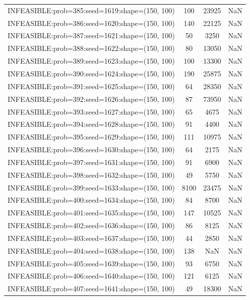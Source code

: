 \begin{longtable}{lccc}
INFEASIBLE:prob=385:seed=1619:shape=(150, 100) &   100 & 23925 &    NaN \\
INFEASIBLE:prob=386:seed=1620:shape=(150, 100) &   140 & 22125 &    NaN \\
INFEASIBLE:prob=387:seed=1621:shape=(150, 100) &    50 &  3250 &    NaN \\
INFEASIBLE:prob=388:seed=1622:shape=(150, 100) &    80 & 13050 &    NaN \\
INFEASIBLE:prob=389:seed=1623:shape=(150, 100) &   100 & 13300 &    NaN \\
INFEASIBLE:prob=390:seed=1624:shape=(150, 100) &   190 & 25875 &    NaN \\
INFEASIBLE:prob=391:seed=1625:shape=(150, 100) &    64 & 28350 &    NaN \\
INFEASIBLE:prob=392:seed=1626:shape=(150, 100) &    87 & 73950 &    NaN \\
INFEASIBLE:prob=393:seed=1627:shape=(150, 100) &    65 &  4675 &    NaN \\
INFEASIBLE:prob=394:seed=1628:shape=(150, 100) &    91 &  4400 &    NaN \\
INFEASIBLE:prob=395:seed=1629:shape=(150, 100) &   111 & 10975 &    NaN \\
INFEASIBLE:prob=396:seed=1630:shape=(150, 100) &    64 &  2175 &    NaN \\
INFEASIBLE:prob=397:seed=1631:shape=(150, 100) &    91 &  6900 &    NaN \\
INFEASIBLE:prob=398:seed=1632:shape=(150, 100) &    49 &  5750 &    NaN \\
INFEASIBLE:prob=399:seed=1633:shape=(150, 100) &  8100 & 23475 &    NaN \\
INFEASIBLE:prob=400:seed=1634:shape=(150, 100) &    84 &  8700 &    NaN \\
INFEASIBLE:prob=401:seed=1635:shape=(150, 100) &   147 & 10525 &    NaN \\
INFEASIBLE:prob=402:seed=1636:shape=(150, 100) &    86 &  8125 &    NaN \\
INFEASIBLE:prob=403:seed=1637:shape=(150, 100) &    44 &  2850 &    NaN \\
INFEASIBLE:prob=404:seed=1638:shape=(150, 100) &   138 &   NaN &    NaN \\
INFEASIBLE:prob=405:seed=1639:shape=(150, 100) &    93 &  6750 &    NaN \\
INFEASIBLE:prob=406:seed=1640:shape=(150, 100) &   121 &  6125 &    NaN \\
INFEASIBLE:prob=407:seed=1641:shape=(150, 100) &    49 & 18300 &    NaN \\

\end{longtable}
